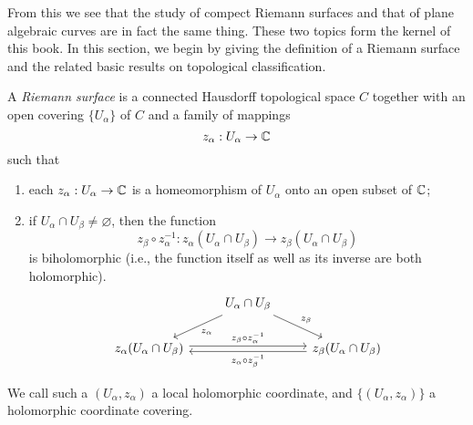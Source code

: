 From this we see that the study of compect Riemann surfaces and that of plane algebraic curves are in fact the same thing. These two topics form the kernel of this book. In this section, we begin by giving the definition of a Riemann surface and the related basic results on topological classification. 
\begin{definition}
    A \textit{Riemann surface} is a connected Hausdorff topological space $C$ together with an open covering $\{U_\alpha\}$ of $C$ and a family of mappings 
    \[z_\alpha:U_\alpha\to\mathbb{C}\]
    such that
    \begin{enumerate}
        \item each $z_\alpha:U_\alpha\to\mathbb{C}$ is a homeomorphism of $U_\alpha$ onto an open subset of $\mathbb{C}$; 
        \item if $U_\alpha\cap U_\beta\neq\varnothing$, then the function 
        \[z_\beta\circ z_\alpha^{-1}:z_\alpha(U_\alpha\cap U_\beta)\to z_\beta(U_\alpha\cap U_\beta)\]
        is biholomorphic (i.e., the function itself as well as its inverse are both holomorphic). 
        \[\begin{tikzcd}
            &U_\alpha\cap U_\beta\arrow[ld,"z_\alpha"]\arrow[rd,"z_\beta"]&\\
            z_\alpha(U_\alpha\cap U_\beta)\arrow[rr,"z_\beta\circ z_\alpha^{-1}",shift left=.5ex]&&z_\beta(U_\alpha\cap U_\beta\arrow[ll,"z_\alpha\circ z_\beta^{-1}",shift left=.5ex])
        \end{tikzcd}\]
    \end{enumerate}
    We call such a $(U_\alpha,z_\alpha)$ a local holomorphic coordinate, and $\{(U_\alpha,z_\alpha)\}$ a holomorphic coordinate covering. 
\end{definition}

